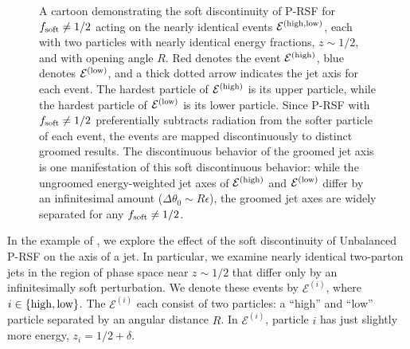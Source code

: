 \begin{figure}[t!]
{
}
\caption[A cartoon demonstrating the soft discontinuity of P-RSF for \(f_{\rm soft} \neq 1/2\) acting on toy jets.]{
A cartoon demonstrating the soft discontinuity of P-RSF for \(f_{\rm soft} \neq 1/2\) acting on the nearly identical events \(\mathcal E^{(\rm high, low)}\), each with two particles with nearly identical energy fractions, \(z \sim 1/2\), and with opening angle \(R\).
%
Red denotes the event \(\mathcal E^{(\rm high)}\), blue denotes \(\mathcal E^{(\rm low)}\), and a thick dotted arrow indicates the jet axis for each event.
%
The hardest particle of \(\mathcal E^{(\rm high)}\) is its upper particle, while the hardest particle of \(\mathcal E^{(\rm low)}\) is its lower particle.
%
Since P-RSF with \(f_{\rm soft} \neq 1/2\) preferentially subtracts radiation from the softer particle of each event, the events are mapped discontinuously to distinct groomed results.
%
The discontinuous behavior of the groomed jet axis is one manifestation of this soft discontinuous behavior:
%
while the ungroomed energy-weighted jet axes of \(\mathcal E^{(\rm high)}\) and \(\mathcal E^{(\rm low)}\) differ by an infinitesimal amount (\(\Delta\theta_0 \sim R \epsilon\)), the groomed jet axes are widely separated for any \(f_{\rm soft} \neq 1/2\).
}
\label{fig:rsf_discont}
\end{figure}

In the example of , we explore the effect of the soft discontinuity of Unbalanced P-RSF on the axis of a jet.
%
In particular, we examine nearly identical two-parton jets in the region of phase space near \(z \sim 1/2\) that differ only by an infinitesimally soft perturbation.
%
We denote these events by \(\mathcal{E}^{(i)}\), where \(i \in \{{\rm high, low}\}\).
%
The \(\mathcal E^{(i)}\) each consist of two particles: a ``high'' and ``low'' particle separated by an angular distance \(R\).
%
In \(\mathcal{E}^{(i)}\), particle \(i\) has just slightly more energy, \(z_i = 1/2 + \delta\).

